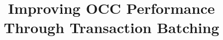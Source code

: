 \documentclass{vldb}
\newcommand{\eat}[1]{} %
\begin{document}

\title{Improving OCC Performance Through Transaction Batching}



%
%
%
%

\eat{
\author{
%
%
}
}

\maketitle
\end{document}
